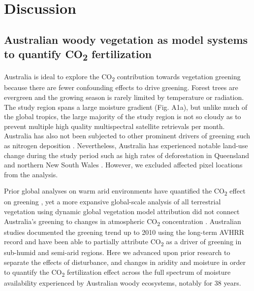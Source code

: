 \documentclass[gc, manuscript]{copernicus}
\begin{document}
\section{Discussion}

\subsection{\texorpdfstring{Australian woody vegetation as model systems
to quantify CO\textsubscript{2}
fertilization}{Australian woody vegetation as model systems to quantify CO2 fertilization}}

Australia is ideal to explore the CO\textsubscript{2} contribution
towards vegetation greening because there are fewer confounding effects
to drive greening. Forest trees are evergreen and the growing season is
rarely limited by temperature or radiation. The study region spans a
large moisture gradient (Fig. A1a), but unlike much of the global
tropics, the large majority of the study region is not so cloudy as to
prevent multiple high quality multispectral satellite retrievals per
month. Australia has also not been subjected to other prominent drivers
of greening such as nitrogen deposition
\citep{ackermanGlobalEstimatesInorganic2019}. Nevertheless, Australia
has experienced notable land-use change during the study period such as
high rates of deforestation in Queensland and northern New South Wales
\citep{evansDeforestationAustraliaDrivers2016}. However, we excluded
affected pixel locations from the analysis.

Prior global analyses on warm arid environments have quantified the
CO\textsubscript{2} effect on greening
\citep{donohueImpactCOFertilization2013b}, yet a more expansive
global-scale analysis of all terrestrial vegetation using dynamic global
vegetation model attribution did not connect Australia's greening to
changes in atmospheric CO\textsubscript{2} concentration
\citep{zhuGreeningEarthIts2016a}. Australian studies documented the
greening trend up to 2010 using the long-term AVHRR record
\citep{donohueClimaterelatedTrendsAustralian2009c, ukkolaReducedStreamflowWaterstressed2016b}
and have been able to partially attribute CO\textsubscript{2} as a
driver of greening in sub-humid and semi-arid regions. Here we advanced
upon prior research to separate the effects of disturbance, and changes
in aridity and moisture in order to quantify the CO\textsubscript{2}
fertilization effect across the full spectrum of moisture availability
experienced by Australian woody ecosystems, notably for 38 years.
\end{document}

